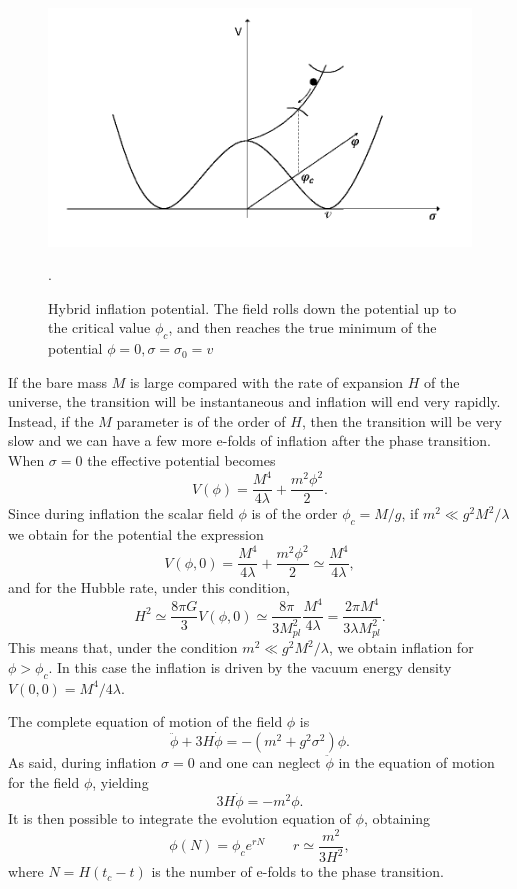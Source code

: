 \documentclass[11pt,a4paper,twoside]{book}
\begin{document}
 \begin{figure}
 	\centering
 	\includegraphics[width=0.55\linewidth, height=0.25\textheight]{Images/Chap2/HybridModel_GWFromInflation_Fig4}
 	\caption{Hybrid inflation potential. The field rolls down the potential up to the critical value $\phi_{c}$, and then reaches the true minimum of the potential $ \phi=0,\sigma=\sigma_{0}=v$ \cite{GWFromInflation:Intro}}
 	\label{fig:hybridmodelgwfrominflationfig4}.
 \end{figure} 
 If the bare mass $ M $ is large compared with the rate of expansion $H$ of the universe, the transition will be instantaneous and inflation will end very rapidly. Instead, if the $ M $ parameter is of the order of $ H $, then the transition will be very slow and we can have a few more e-folds of inflation after the phase transition. When $ \sigma=0 $ the effective potential becomes
 \begin{equation}
 \label{effectivePotential}
 V(\phi)=\frac{M^{4}}{4\lambda} +  \frac{m^{2} \phi^{2}}{2}.
 \end{equation}
Since during inflation the scalar field $\phi$ is of the order $\phi_{c}=M/g$, if $ m^{2} \ll g^{2}M^{2}/\lambda $ we obtain for the potential the expression
\begin{equation}
	\label{potential}
	V(\phi,0)=\frac{M^{4}}{4\lambda} +  \frac{m^{2} \phi^{2}}{2} \simeq \frac{M^{4}}{4\lambda},
\end{equation} 
and for the Hubble rate, under this condition,
\begin{equation}
	\label{Chap2:HubbleHybrid}
	H^{2}\simeq\frac{8\pi G}{3} V(\phi,0) \simeq \frac{8\pi }{3M_{pl}^{2}}\frac{M^{4}}{4\lambda} =\frac{2\pi M^{4}}{3\lambda M_{pl}^{2}}.
\end{equation}
This means that, under the condition $  m^{2} \ll g^{2}M^{2}/\lambda $, we obtain inflation for $ \phi > \phi_{c} $. In this case the inflation is driven by the vacuum energy density $ V(0,0) = M^{4}/4\lambda $.

The complete equation of motion of the field $\phi$ is
\begin{equation}
	\ddot{\phi} + 3H\dot{\phi}=-(m^{2} + g^{2}\sigma^{2})\phi.
\end{equation}
As said, during inflation $\sigma=0$ and one can neglect $\ddot{\phi}$ in the equation of motion for the field $\phi$, yielding
\begin{equation}
	\label{eom}
	3H\dot{\phi}=-m^{2}\phi.
\end{equation}
It is then possible to integrate the evolution equation of $\phi$, obtaining
\begin{equation}	
	\label{Chap2:solutionField}
	\phi(N)=\phi_{c}e^{rN} \qquad r\simeq \frac{m^{2}}{3H^{2}},
\end{equation}
where $ N=H(t_{c}-t) $ is the number of e-folds to the phase transition.
\end{document}
